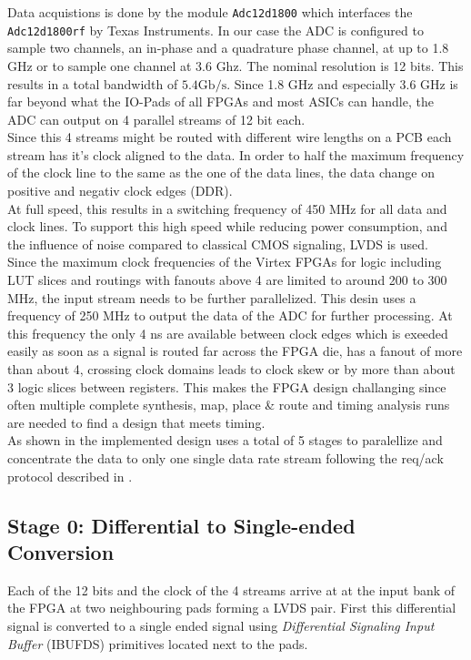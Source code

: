 Data acquistions is done by the module \verb|Adc12d1800| which interfaces
the \verb|Adc12d1800rf| by Texas Instruments. In our case the ADC is configured
to sample two channels, an in-phase and a quadrature phase channel, at up to 1.8 GHz
or to sample one channel at 3.6 Ghz. The nominal resolution is 12 bits.
This results in a total bandwidth of $5.4 \text{Gb}/\text{s}$.
Since 1.8 GHz and especially 3.6 GHz is far beyond what the IO-Pads of all
\glspl{FPGA}  and most \glspl{ASIC} can handle,
the ADC can output on 4 parallel streams of 12 bit each. \\

Since this 4 streams might be routed with different wire lengths on a \gls{PCB}
each stream has it's clock aligned to the data.
In order to half the maximum frequency of the clock line to the same as the one
of the data lines, the data change on positive and negativ clock edges
(\gls{DDR}). \\

At full speed, this results in a switching frequency of 450 MHz for all data
and clock lines. To support this high speed while reducing power consumption,
and the influence of noise compared to classical \gls{CMOS} signaling,
\gls{LVDS} is used. \\

Since the maximum clock frequencies of the Virtex \glspl{FPGA} for logic
including \gls{LUT} slices and routings with fanouts above 4
are limited to around 200 to 300 MHz, the input stream needs to be further
parallelized. This desin uses a frequency of 250 MHz to output
the data of the \gls{ADC} for further processing. At this frequency
the only 4 ns are available between clock edges which is exeeded easily
as soon as a signal is routed far across the \gls{FPGA} die,
has a fanout of more than about 4, crossing clock domains leads
to clock skew or by more than about 3 logic slices between registers.
This makes the \gls{FPGA} design challanging since often multiple
complete synthesis, map, place \& route and timing analysis runs are
needed to find a design that meets timing. \\

As shown in  the implemented design uses
a total of 5 stages to paralellize and concentrate the data to only
one single data rate stream following the req/ack protocol described in
.

\subsection{Stage 0: Differential to Single-ended Conversion}
Each of the 12 bits and the clock of the 4 streams arrive at at the input bank
of the \gls{FPGA} at two neighbouring pads forming a \gls{LVDS} pair.
First this differential signal is converted to a single ended signal using
{\em Differential Signaling Input Buffer} (IBUFDS) primitives located next
to the pads. \\

